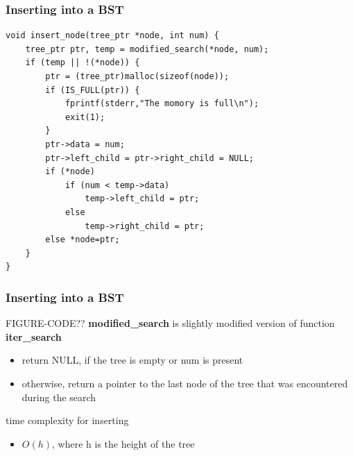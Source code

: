\documentclass[newPxFont,sthlmFooter,nooffset]{beamer}
\begin{document}
\begin{frame}[t, fragile]
  \frametitle{Inserting into a BST}
  \begin{lstlisting}
void insert_node(tree_ptr *node, int num) { 
    tree_ptr ptr, temp = modified_search(*node, num); 
    if (temp || !(*node)) {
        ptr = (tree_ptr)malloc(sizeof(node)); 
        if (IS_FULL(ptr)) {
            fprintf(stderr,"The momory is full\n"); 
            exit(1);
        }
        ptr->data = num;
        ptr->left_child = ptr->right_child = NULL; 
        if (*node)
            if (num < temp->data) 
                temp->left_child = ptr;
            else
                temp->right_child = ptr;
        else *node=ptr; 
    }
}
 \end{lstlisting}
\end{frame}


\begin{frame}[t, fragile]
  \frametitle{Inserting into a BST}

FIGURE-CODE??
\textbf{modified\_search} is slightly modified version of function \textbf{iter\_search}
\begin{itemize}
\item return NULL, if the tree is empty or num is present
\item otherwise, return a pointer to the last node of the tree that
  was encountered during the search
\end{itemize}

time complexity for inserting
\begin{itemize}
\item  $O(h)$, where h is the height of the tree
\end{itemize}

\end{frame}
\end{document}
